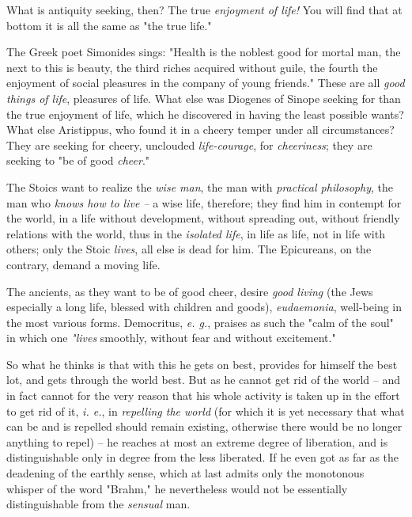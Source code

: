 \documentclass[a4paper]{book}
\begin{document}
What is antiquity seeking, then? The true \textit{enjoyment of life!} You will 
find that at bottom it is all the same as "{}the true life."{}

The Greek poet Simonides sings: "{}Health is the noblest good for mortal man, 
the next to this is beauty, the third riches acquired without guile, the 
fourth the enjoyment of social pleasures in the company of young friends."{} 
These are all \textit{good things of life}, pleasures of life. What else was 
Diogenes of Sinope seeking for than the true enjoyment of life, which he 
discovered in having the least possible wants? What else Aristippus, who found 
it in a cheery temper under all circumstances? They are seeking for cheery, 
unclouded \textit{life-courage}, for \textit{cheeriness}; they are seeking to 
"{}be of good \textit{cheer}."{}

The Stoics want to realize the \textit{wise man}, the man with 
\textit{practical philosophy}, the man who \textit{knows how to live --} a 
wise life, therefore; they find him in contempt for the world, in a life 
without development, without spreading out, without friendly relations with 
the world, thus in the \textit{isolated life}, in life as life, not in life 
with others; only the Stoic \textit{lives}, all else is dead for him. The 
Epicureans, on the contrary, demand a moving life.

The ancients, as they want to be of good cheer, desire \textit{good living} 
(the Jews especially a long life, blessed with children and goods), 
\textit{eudaemonia}, well-being in the most various forms. Democritus, 
\textit{e. g.}, praises as such the "{}calm of the soul"{} in which one 
\textit{"{}lives} smoothly, without fear and without excitement."{}

So what he thinks is that with this he gets on best, provides for himself the 
best lot, and gets through the world best. But as he cannot get rid of the 
world -- and in fact cannot for the very reason that his whole activity is 
taken up in the effort to get rid of it, \textit{i. e.}, in \textit{repelling 
the world} (for which it is yet necessary that what can be and is repelled 
should remain existing, otherwise there would be no longer anything to repel) 
-- he reaches at most an extreme degree of liberation, and is distinguishable 
only in degree from the less liberated. If he even got as far as the deadening 
of the earthly sense, which at last admits only the monotonous whisper of the 
word "{}Brahm,"{} he nevertheless would not be essentially distinguishable 
from the \textit{sensual} man.
\end{document}
